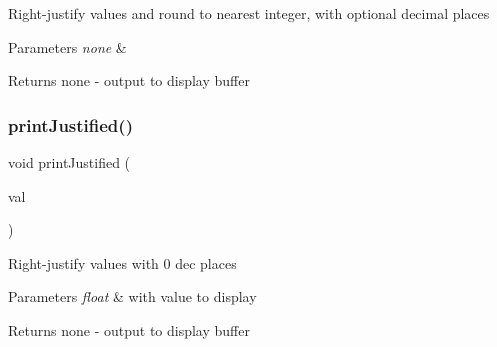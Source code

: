 Right-\/justify values and round to nearest integer, with optional decimal places


\begin{DoxyParams}{Parameters}
{\em none} & \\
\hline
\end{DoxyParams}
\begin{DoxyReturn}{Returns}
none -\/ output to display buffer 
\end{DoxyReturn}
\hypertarget{_u_s_b___tester___o_l_e_d__128x64___beta__2_82_8ino_a8bcd3663872bac5388715168c9f920f9}{}\label{_u_s_b___tester___o_l_e_d__128x64___beta__2_82_8ino_a8bcd3663872bac5388715168c9f920f9} 
\subsubsection{\texorpdfstring{print\+Justified()}{printJustified()}\hspace{0.1cm}{\footnotesize\ttfamily [2/2]}}
{\footnotesize\ttfamily void print\+Justified (\begin{DoxyParamCaption}\item[{float}]{val }\end{DoxyParamCaption})}

Right-\/justify values with 0 dec places


\begin{DoxyParams}{Parameters}
{\em float} & with value to display \\
\hline
\end{DoxyParams}
\begin{DoxyReturn}{Returns}
none -\/ output to display buffer 
\end{DoxyReturn}
\hypertarget{_u_s_b___tester___o_l_e_d__128x64___beta__2_82_8ino_a59a80ae858165fdda78ca17e168079ad}{}\label{_u_s_b___tester___o_l_e_d__128x64___beta__2_82_8ino_a59a80ae858165fdda78ca17e168079ad} 
